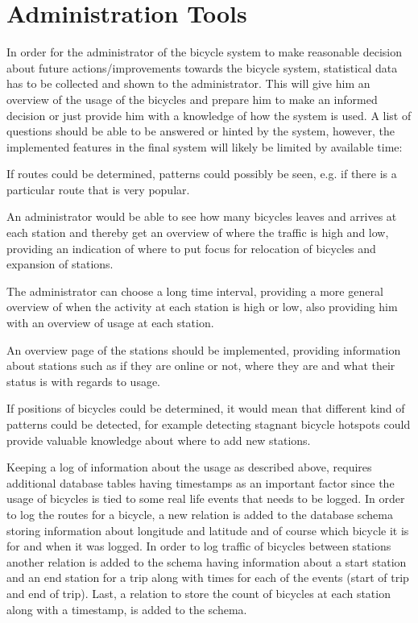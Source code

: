 \section{Administration Tools}\label{sec:designAdminTools}
In order for the administrator of the bicycle system to make reasonable decision about future actions/improvements towards the bicycle system, statistical data has to be collected and shown to the administrator. This will give him an overview of the usage of the bicycles and prepare him to make an informed decision or just provide him with a knowledge of how the system is used.
A list of questions should be able to be answered or hinted by the system, however, the implemented features in the final system will likely be limited by available time:

\begin{description}[style=nextline]
\item[Which routes are used?] If routes could be determined, patterns could possibly be seen, e.g. if there is a particular route that is very popular.
\item[Where is the most traffic of bicycles during some period?] An administrator would be able to see how many bicycles leaves and arrives at each station and thereby get an overview of where the traffic is high and low, providing an indication of where to put focus for relocation of bicycles and expansion of stations.
\item[How does the amount of bicycles at a given station change over time?] The administrator can choose a long time interval, providing a more general overview of when the activity at each station is high or low, also providing him with an overview of usage at each station.
\item[What is the status of the stations?]
An overview page of the stations should be implemented, providing information about stations such as if they are online or not, where they are and what their status is with regards to usage.
\item[Are there hotspots for bicycles?] If positions of bicycles could be determined, it would mean that different kind of patterns could be detected, for example detecting stagnant bicycle hotspots could provide valuable knowledge about where to add new stations.
\end{description}

Keeping a log of information about the usage as described above, requires additional database tables having timestamps as an important factor since the usage of bicycles is tied to some real life events that needs to be logged. 
In order to log the routes for a bicycle, a new relation is added to the database schema storing information about longitude and latitude and of course which bicycle it is for and when it was logged.
In order to log traffic of bicycles between stations another relation is added to the schema having information about a start station and an end station for a trip along with times for each of the events (start of trip and end of trip).
Last, a relation to store the count of bicycles at each station along with a timestamp, is added to the schema.


